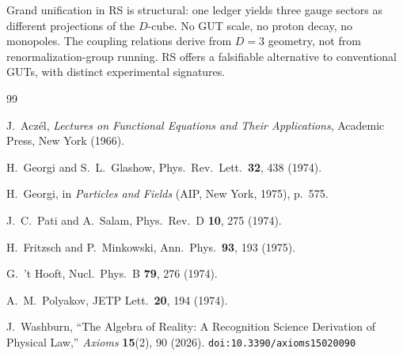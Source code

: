 \documentclass[12pt,a4paper]{article}
\theoremstyle{definition}
\theoremstyle{remark}
\begin{document}
Grand unification in RS is structural: one ledger yields three
gauge sectors as different projections of the $D$-cube.  No GUT
scale, no proton decay, no monopoles.  The coupling relations
derive from $D = 3$ geometry, not from renormalization-group
running.  RS offers a falsifiable alternative to conventional
GUTs, with distinct experimental signatures.

\begin{thebibliography}{99}

J.~Acz\'el, \emph{Lectures on Functional Equations and Their Applications},
Academic Press, New York (1966).

H.~Georgi and S.~L.~Glashow, Phys.\ Rev.\ Lett.\ \textbf{32}, 438 (1974).

H.~Georgi, in \emph{Particles and Fields} (AIP, New York, 1975), p.~575.

J.~C.~Pati and A.~Salam, Phys.\ Rev.\ D \textbf{10}, 275 (1974).

H.~Fritzsch and P.~Minkowski, Ann.\ Phys.\ \textbf{93}, 193 (1975).

G.~'t Hooft, Nucl.\ Phys.\ B \textbf{79}, 276 (1974).

A.~M.~Polyakov, JETP Lett.\ \textbf{20}, 194 (1974).

J.~Washburn, ``The Algebra of Reality: A Recognition Science Derivation
of Physical Law,'' \emph{Axioms} \textbf{15}(2), 90 (2026).
\texttt{doi:10.3390/axioms15020090}
\end{thebibliography}
\end{document}
